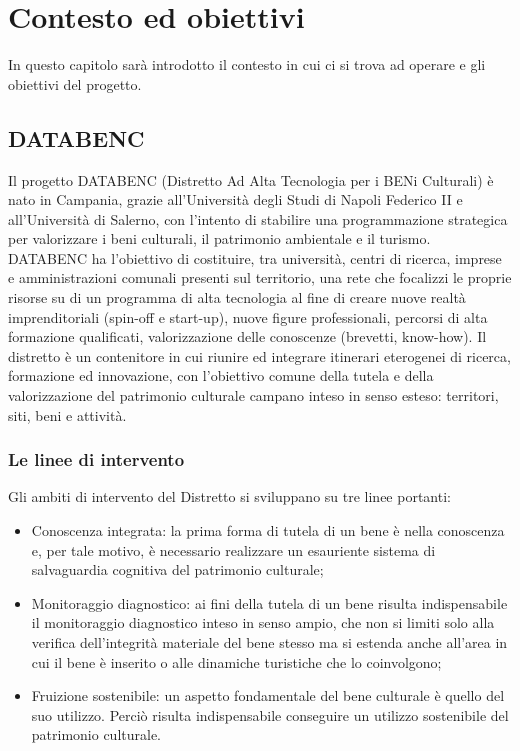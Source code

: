 
\chapter{Contesto ed obiettivi}
\label{ref:contesto}
In questo capitolo sarà introdotto il contesto in cui ci si trova ad operare e gli obiettivi del progetto.


\section{DATABENC}
Il progetto DATABENC \cite{www:DATABENC} (Distretto Ad Alta Tecnologia per i BENi Culturali) è nato in Campania, grazie all'Università degli Studi di Napoli Federico II e all'Università di Salerno, con l'intento di stabilire una programmazione strategica per valorizzare i beni culturali, il patrimonio ambientale e il turismo.
DATABENC ha l'obiettivo di costituire, tra università, centri di ricerca, imprese e amministrazioni comunali presenti sul territorio, una rete che focalizzi le proprie risorse su di un programma di alta tecnologia al fine di creare nuove realtà imprenditoriali (spin-off e start-up), nuove figure professionali, percorsi di alta formazione qualificati, valorizzazione delle conoscenze (brevetti, know-how). 
Il distretto è un contenitore in cui riunire ed integrare itinerari eterogenei di ricerca, formazione ed innovazione, con l'obiettivo comune della tutela e della valorizzazione del patrimonio culturale campano inteso in senso esteso: territori, siti, beni e attività. 
\subsection{Le linee di intervento}
Gli ambiti di intervento del Distretto si sviluppano su tre linee portanti: 
\begin{itemize}
\item Conoscenza integrata: la prima forma di tutela di un bene è nella conoscenza e, per tale motivo, è necessario realizzare un esauriente sistema di salvaguardia cognitiva del patrimonio culturale;
\item Monitoraggio diagnostico: ai fini della tutela di un bene risulta indispensabile il monitoraggio diagnostico inteso in senso ampio, che non si limiti solo alla verifica dell'integrità materiale del bene stesso ma si estenda anche all'area in cui il bene è inserito o alle dinamiche turistiche che lo coinvolgono;
\item Fruizione sostenibile: un aspetto fondamentale del bene culturale è quello del suo utilizzo.  Perciò risulta indispensabile conseguire un utilizzo sostenibile del patrimonio culturale.
\end{itemize}

